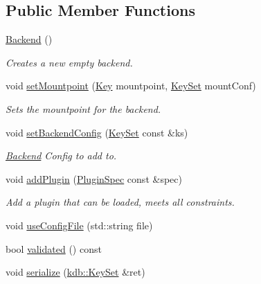 \subsection*{Public Member Functions}
\begin{DoxyCompactItemize}
\item 
\mbox{\label{classkdb_1_1tools_1_1Backend_a1650b149ebf313ee8cd3472247212263}} 
\hyperlink{classkdb_1_1tools_1_1Backend_a1650b149ebf313ee8cd3472247212263}{Backend} ()
\begin{DoxyCompactList}\small\item\em Creates a new empty backend. \end{DoxyCompactList}\item 
void \hyperlink{classkdb_1_1tools_1_1Backend_ac61b2628800a6fd0a6620ff47bfb3be9}{set\+Mountpoint} (\hyperlink{classkdb_1_1Key}{Key} mountpoint, \hyperlink{classkdb_1_1KeySet}{Key\+Set} mount\+Conf)
\begin{DoxyCompactList}\small\item\em Sets the mountpoint for the backend. \end{DoxyCompactList}\item 
void \hyperlink{classkdb_1_1tools_1_1Backend_aa7aa17a1c97cdfa48bcebadb7bc00247}{set\+Backend\+Config} (\hyperlink{classkdb_1_1KeySet}{Key\+Set} const \&ks)
\begin{DoxyCompactList}\small\item\em \hyperlink{classkdb_1_1tools_1_1Backend}{Backend} Config to add to. \end{DoxyCompactList}\item 
void \hyperlink{classkdb_1_1tools_1_1Backend_a2cce1cc51617baa5431a6036f5cfe05b}{add\+Plugin} (\hyperlink{classkdb_1_1tools_1_1PluginSpec}{Plugin\+Spec} const \&spec)
\begin{DoxyCompactList}\small\item\em Add a plugin that can be loaded, meets all constraints. \end{DoxyCompactList}\item 
void \hyperlink{classkdb_1_1tools_1_1Backend_a5c72747e5419d7802849cfc2eb4064d2}{use\+Config\+File} (std\+::string file)
\item 
bool \hyperlink{classkdb_1_1tools_1_1Backend_a7b28929231bc592c1a83f42121405496}{validated} () const
\item 
void \hyperlink{classkdb_1_1tools_1_1Backend_a93638ae12d8880bdb528ae709c857be7}{serialize} (\hyperlink{classkdb_1_1KeySet}{kdb\+::\+Key\+Set} \&ret)
\end{DoxyCompactItemize}


